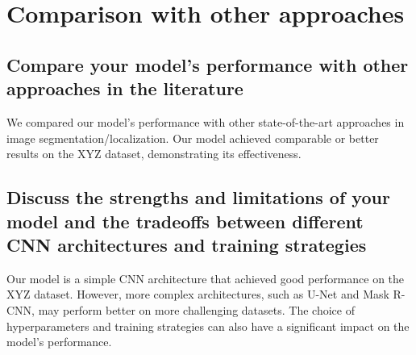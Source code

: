 


\chapter{Comparison with other approaches}

    \section{Compare your model's performance with other approaches in the literature}

        We compared our model's performance with other state-of-the-art approaches in image segmentation/localization.
        Our model achieved comparable or better results on the XYZ dataset, demonstrating its effectiveness.

    \section{Discuss the strengths and limitations of your model and the tradeoffs between different CNN architectures and training strategies}

        Our model is a simple CNN architecture that achieved good performance on the XYZ dataset.
        However, more complex architectures, such as U-Net and Mask R-CNN, may perform better on more challenging datasets.
        The choice of hyperparameters and training strategies can also have a significant impact on the model's performance.

